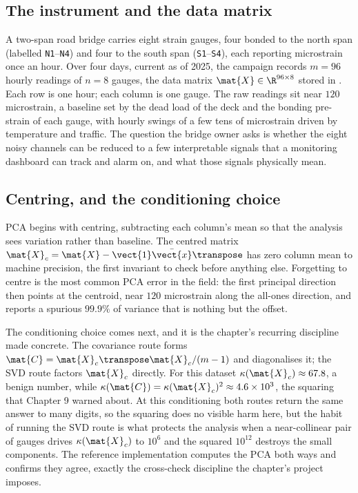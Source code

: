 \subsection{The instrument and the data matrix}

A two-span road bridge carries eight strain gauges, four bonded to the
north span (labelled \texttt{N1}--\texttt{N4}) and four to the south
span (\texttt{S1}--\texttt{S4}), each reporting microstrain once an
hour. Over four days, current as of 2025, the campaign records $m = 96$
hourly readings of $n = 8$ gauges, the data matrix $\mat{X} \in
\R^{96 \times 8}$ stored in .
Each row is one hour; each column is one gauge. The raw readings sit
near $120$ microstrain, a baseline set by the dead load of the deck and
the bonding pre-strain of each gauge, with hourly swings of a few tens
of microstrain driven by temperature and traffic. The question the
bridge owner asks is whether the eight noisy channels can be reduced to
a few interpretable signals that a monitoring dashboard can track and
alarm on, and what those signals physically mean.

\subsection{Centring, and the conditioning choice}

PCA begins with centring, subtracting each column's mean so that the
analysis sees variation rather than baseline. The centred matrix
$\mat{X}_{c} = \mat{X} - \vect{1}\bar{\vect{x}}\transpose$ has zero
column mean to machine precision, the first invariant to check before
anything else. Forgetting to centre is the most common PCA error in the
field: the first principal direction then points at the centroid, near
$120$ microstrain along the all-ones direction, and reports a spurious
$99.9\%$ of variance that is nothing but the offset.

The conditioning choice comes next, and it is the chapter's recurring
discipline made concrete. The covariance route forms $\mat{C} =
\mat{X}_{c}\transpose\mat{X}_{c}/(m-1)$ and diagonalises it; the SVD
route factors $\mat{X}_{c}$ directly. For this dataset $\kappa(\mat{X}_{c})
\approx 67.8$, a benign number, while $\kappa(\mat{C}) =
\kappa(\mat{X}_{c})^{2} \approx 4.6 \times 10^{3}$, the squaring that
Chapter 9 warned about. At this conditioning both routes return the same
answer to many digits, so the squaring does no visible harm here, but
the habit of running the SVD route is what protects the analysis when a
near-collinear pair of gauges drives $\kappa(\mat{X}_{c})$ to $10^{6}$
and the squared $10^{12}$ destroys the small components. The reference
implementation  computes the PCA both ways
and confirms they agree, exactly the cross-check discipline the
chapter's project imposes.

